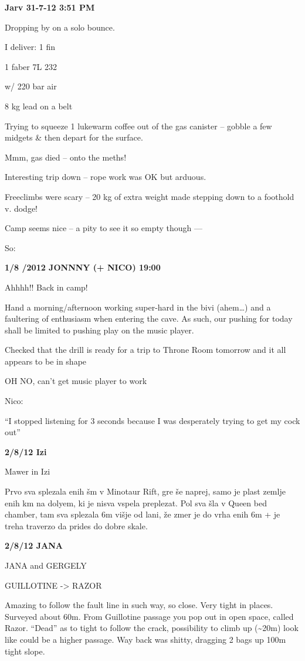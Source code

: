 \textbf{Jarv 31-7-12 3:51 PM}

Dropping by on a solo bounce.

I deliver: 1 fin

1 faber 7L 232

w/ 220 bar air

8 kg lead on a belt

Trying to squeeze 1 lukewarm coffee out of the gas canister -- gobble a
few midgets \& then depart for the surface.

Mmm, gas died -- onto the meths!

Interesting trip down -- rope work was OK but arduous.

Freeclimbs were scary -- 20 kg of extra weight made stepping down to a
foothold v. dodge!

Camp seems nice -- a pity to see it so empty though ---

So:

\textbf{1/8 /2012 JONNNY (+ NICO) 19:00}

Ahhhh!! Back in camp!

Hand a morning/afternoon working super-hard in the bivi (ahem\ldots{})
and a faultering of enthusiasm when entering the cave. As such, our
pushing for today shall be limited to pushing play on the music player.

Checked that the drill is ready for a trip to Throne Room tomorrow and
it all appears to be in shape

OH NO, can't get music player to work

Nico:

``I stopped listening for 3 seconds because I was desperately trying to
get my cock out''

\textbf{2/8/12 Izi}

Mawer in Izi

Prvo sva splezala enih šm v Minotaur Rift, gre še naprej, samo je plast
zemlje enih km na dolyem, ki je nisva vspela preplezat. Pol sva šla v
Queen bed chamber, tam sva splezala 6m višje od lani, že zmer je do vrha
enih 6m + je treha traverzo da prides do dobre skale.

\textbf{2/8/12 JANA}

JANA and GERGELY

GUILLOTINE -\textgreater{} RAZOR

Amazing to follow the fault line in such way, so close. Very tight in
places. Surveyed about 60m. From Guillotine passage you pop out in open
space, called Razor. ``Dead'' as to tight to follow the crack,
possibility to climb up (\textasciitilde{}20m) look like could be a
higher passage. Way back was shitty, dragging 2 bags up 100m tight
slope.

